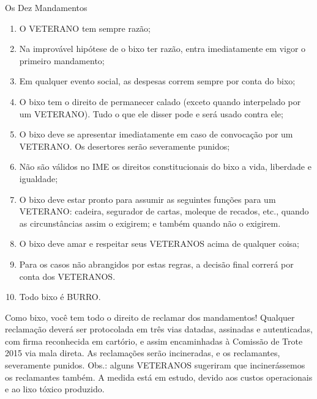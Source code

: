 \begin{editorial}{Os Dez Mandamentos}
  \begin{enumerate}
  \item O VETERANO tem sempre razão;
  \item Na improvável hipótese de o bixo ter razão, entra imediatamente
        em vigor o primeiro mandamento;
  \item Em qualquer evento social, as despesas correm sempre por conta
        do bixo;
  \item O bixo tem o direito de permanecer calado (exceto quando interpelado
        por um VETERANO). Tudo o que ele disser pode e será usado contra ele;
  \item O bixo deve se apresentar imediatamente em caso de convocação por
        um VETERANO. Os desertores serão severamente punidos;
  \item Não são válidos no IME os direitos constitucionais do bixo a vida,
        liberdade e igualdade;
  \item O bixo deve estar pronto para assumir as seguintes funções para um
        VETERANO: cadeira, segurador de cartas, moleque de recados, etc., quando
        as circunstâncias assim o exigirem; e também quando não o exigirem.
  \item O bixo deve amar e respeitar seus VETERANOS acima de qualquer
        coisa;
  \item Para os casos não abrangidos por estas regras, a decisão final
        correrá por conta dos VETERANOS.
  \item Todo bixo é BURRO.
  \end{enumerate}


Como bixo, você tem todo o direito de reclamar dos mandamentos! Qualquer
reclamação deverá ser protocolada em três vias datadas, assinadas e autenticadas,
com firma reconhecida em cartório, e assim encaminhadas à Comissão de Trote 2015 %
via mala direta. As reclamações serão incineradas, e os reclamantes, severamente
punidos. Obs.: alguns VETERANOS sugeriram que incinerássemos os reclamantes também.
A medida está em estudo, devido aos custos operacionais e ao lixo tóxico produzido.

\thispagestyle{empty}
\end{editorial}

